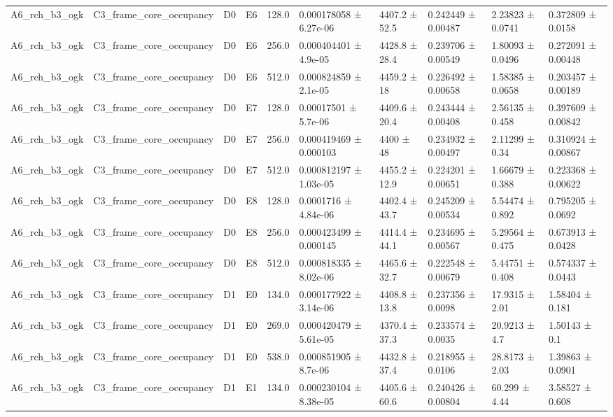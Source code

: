 \begin{table}
\begin{tabular}{llllllllll}
A6\_rch\_b3\_ogk & C3\_frame\_core\_occupancy & D0 & E6 & 128.0 & 0.000178058 ± 6.27e-06 & 4407.2 ± 52.5 & 0.242449 ± 0.00487 & 2.23823 ± 0.0741 & 0.372809 ± 0.0158 \\
A6\_rch\_b3\_ogk & C3\_frame\_core\_occupancy & D0 & E6 & 256.0 & 0.000404401 ± 4.9e-05 & 4428.8 ± 28.4 & 0.239706 ± 0.00549 & 1.80093 ± 0.0496 & 0.272091 ± 0.00448 \\
A6\_rch\_b3\_ogk & C3\_frame\_core\_occupancy & D0 & E6 & 512.0 & 0.000824859 ± 2.1e-05 & 4459.2 ± 18 & 0.226492 ± 0.00658 & 1.58385 ± 0.0658 & 0.203457 ± 0.00189 \\
A6\_rch\_b3\_ogk & C3\_frame\_core\_occupancy & D0 & E7 & 128.0 & 0.00017501 ± 5.7e-06 & 4409.6 ± 20.4 & 0.243444 ± 0.00408 & 2.56135 ± 0.458 & 0.397609 ± 0.00842 \\
A6\_rch\_b3\_ogk & C3\_frame\_core\_occupancy & D0 & E7 & 256.0 & 0.000419469 ± 0.000103 & 4400 ± 48 & 0.234932 ± 0.00497 & 2.11299 ± 0.34 & 0.310924 ± 0.00867 \\
A6\_rch\_b3\_ogk & C3\_frame\_core\_occupancy & D0 & E7 & 512.0 & 0.000812197 ± 1.03e-05 & 4455.2 ± 12.9 & 0.224201 ± 0.00651 & 1.66679 ± 0.388 & 0.223368 ± 0.00622 \\
A6\_rch\_b3\_ogk & C3\_frame\_core\_occupancy & D0 & E8 & 128.0 & 0.0001716 ± 4.84e-06 & 4402.4 ± 43.7 & 0.245209 ± 0.00534 & 5.54474 ± 0.892 & 0.795205 ± 0.0692 \\
A6\_rch\_b3\_ogk & C3\_frame\_core\_occupancy & D0 & E8 & 256.0 & 0.000423499 ± 0.000145 & 4414.4 ± 44.1 & 0.234695 ± 0.00567 & 5.29564 ± 0.475 & 0.673913 ± 0.0428 \\
A6\_rch\_b3\_ogk & C3\_frame\_core\_occupancy & D0 & E8 & 512.0 & 0.000818335 ± 8.02e-06 & 4465.6 ± 32.7 & 0.222548 ± 0.00679 & 5.44751 ± 0.408 & 0.574337 ± 0.0443 \\
A6\_rch\_b3\_ogk & C3\_frame\_core\_occupancy & D1 & E0 & 134.0 & 0.000177922 ± 3.14e-06 & 4408.8 ± 13.8 & 0.237356 ± 0.0098 & 17.9315 ± 2.01 & 1.58404 ± 0.181 \\
A6\_rch\_b3\_ogk & C3\_frame\_core\_occupancy & D1 & E0 & 269.0 & 0.000420479 ± 5.61e-05 & 4370.4 ± 37.3 & 0.233574 ± 0.0035 & 20.9213 ± 4.7 & 1.50143 ± 0.1 \\
A6\_rch\_b3\_ogk & C3\_frame\_core\_occupancy & D1 & E0 & 538.0 & 0.000851905 ± 8.7e-06 & 4432.8 ± 37.4 & 0.218955 ± 0.0106 & 28.8173 ± 2.03 & 1.39863 ± 0.0901 \\
A6\_rch\_b3\_ogk & C3\_frame\_core\_occupancy & D1 & E1 & 134.0 & 0.000230104 ± 8.38e-05 & 4405.6 ± 60.6 & 0.240426 ± 0.00804 & 60.299 ± 4.44 & 3.58527 ± 0.608 \\

\end{tabular}
\end{table}
